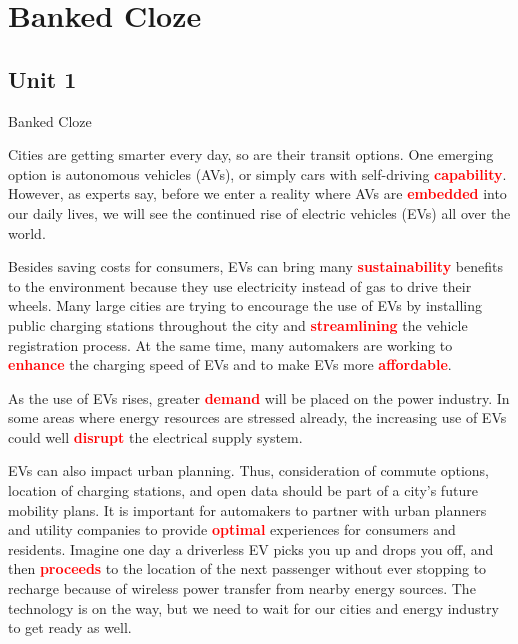 \section{Banked Cloze}
\subsection{Unit 1}

\begin{question}{Banked Cloze}

Cities are getting smarter every day, so are their transit options. One emerging option is autonomous vehicles (AVs), or simply cars with self-driving  \textbf{\textcolor{red}{capability}}. However, as experts say, before we enter a reality where AVs are  \textbf{\textcolor{red}{embedded}} into our daily lives, we will see the continued rise of electric vehicles (EVs) all over the world.

Besides saving costs for consumers, EVs can bring many \textbf{\textcolor{red}{sustainability}} benefits to the environment because they use electricity instead of gas to drive their wheels. Many large cities are trying to encourage the use of EVs by installing public charging stations throughout the city and \textbf{\textcolor{red}{streamlining}} the vehicle registration process. At the same time, many automakers are working to \textbf{\textcolor{red}{enhance}} the charging speed of EVs and to make EVs more \textbf{\textcolor{red}{affordable}}.

As the use of EVs rises, greater \textbf{\textcolor{red}{demand}} will be placed on the power industry. In some areas where energy resources are stressed already, the increasing use of EVs could well \textbf{\textcolor{red}{disrupt}} the electrical supply system.

EVs can also impact urban planning. Thus, consideration of commute options, location of charging stations, and open data should be part of a city's future mobility plans. It is important for automakers to partner with urban planners and utility companies to provide \textbf{\textcolor{red}{optimal}} experiences for consumers and residents. Imagine one day a driverless EV picks you up and drops you off, and then \textbf{\textcolor{red}{proceeds}} to the location of the next passenger without ever stopping to recharge because of wireless power transfer from nearby energy sources. The technology is on the way, but we need to wait for our cities and energy industry to get ready as well.

\end{question}

